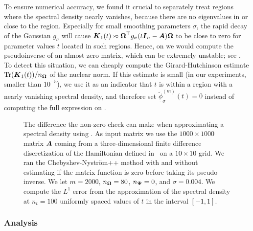 To ensure numerical accuracy, we found it crucial to separately treat regions
where the spectral density nearly vanishes, because there are no eigenvalues in or close to the region.
Especially for small smoothing parameters $\sigma$, the rapid decay of the Gaussian $g_{\sigma}$ will cause $\boldsymbol{K}_1(t) \approx \boldsymbol{\Omega}^{\top} g_{\sigma}(t\boldsymbol{I}_n - \boldsymbol{A}) \boldsymbol{\Omega}$ to be close to zero for parameter values $t$ located in such regions. Hence, on  we would compute the pseudoinverse of an almost zero matrix, which can be extremely unstable; see . To detect this situation, we can cheaply compute the Girard-Hutchinson 
estimate $\operatorname{Tr}(\boldsymbol{K}_1(t)) / n_{\boldsymbol{\Omega}}$ of the nuclear norm. If this estimate is small (in our experiments, smaller than $10^{-5}$), we use it as an indicator that $t$ is within a region with a nearly vanishing spectral density, and therefore set $\widetilde{\underline{\phi}}_{\sigma}^{(m)}(t) = 0$ instead of computing the full expression on .

\begin{figure}[ht]
    \centering
    
    \caption{The difference the non-zero check can make when approximating a spectral density using . As input matrix we use the $1000 \times 1000$ matrix $\boldsymbol{A}$ coming from a three-dimensional finite difference discretization of the Hamiltonian defined in~ on a $10 \times 10$ grid. We ran the Chebyshev-Nyström++ method with and without estimating if the matrix function is zero before taking its pseudo-inverse. We let $m=2000$, $n_{\boldsymbol{\Omega}}=80$, $n_{\boldsymbol{\Psi}}=0$, and $\sigma = 0.004$. We compute the $L^1$ error from the approximation of the spectral density at $n_t = 100$ uniformly spaced values of $t$ in the interval $[-1, 1]$.}
    \label{fig:zerocheck}
\end{figure}

\color{black}

\subsubsection{Analysis}
\label{subsubsec:chebyshev-nystrom-analysis}


